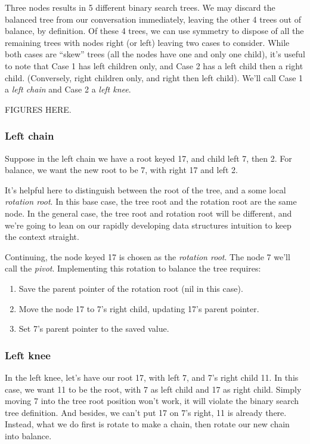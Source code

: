 Three nodes results in 5 different binary search trees. We may discard
the balanced tree from our conversation immediately, leaving the other
4 trees out of balance, by definition. Of these 4 trees, we can use
symmetry to dispose of all the remaining trees with nodes right (or left)
leaving two cases to consider. While both cases are ``skew'' trees
(all the nodes have one and only one child), it's useful to note
that Case 1 has left children only, and Case 2 has a left child then
a right child. (Conversely, right children only, and right then
left child). We'll call Case 1 a \textit{left chain} and Case 2 a
\textit{left knee}.

FIGURES HERE.

\subsubsection{Left chain}

Suppose in the left chain we have a root keyed 17, and child left
7, then 2. For balance, we want the new root to be 7, with right 17
and left 2.

It's helpful here to distinguish between the root of the tree, and a
some local \textit{rotation root}. In this base case, the tree root
and the rotation root are the same node. In the general case, the
tree root and rotation root will be different, and we're going to
lean on our rapidly developing data structures intuition to keep the
context straight.

Continuing, the node keyed 17 is chosen as the \textit{rotation root}.
The node 7 we'll call the \textit{pivot}. Implementing this rotation
to balance the tree requires:

\begin{enumerate}
  \item Save the parent pointer of the rotation root (nil in this case).
  \item Move the node 17 to 7's right child, updating 17's parent pointer.
  \item Set 7's parent pointer to the saved value.
\end{enumerate}

\subsubsection{Left knee}

In the left knee, let's have our root 17, with left 7, and 7's right
child 11. In this case, we want 11 to be the root, with 7 as left
child and 17 as right child. Simply moving 7 into the tree root
position won't work, it will violate the binary search tree definition.
And besides, we can't put 17 on 7's right, 11 is already there.
Instead, what we do first is rotate to make a chain, then rotate
our new chain into balance.

